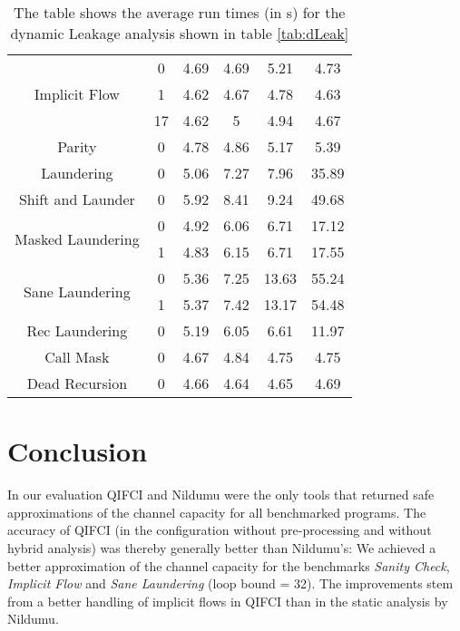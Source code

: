 \begin{table}[]
\begin{tabular}{cc|cc|cc}
\multirow{3}{*}{Implicit Flow}     & 0       & 4.69             & 4.69            & 5.21              & 4.73              \\
                                   & 1       & 4.62             & 4.67            & 4.78              & 4.63              \\
                                   & 17      & 4.62             & 5               & 4.94              & 4.67              \\\hline\hline
Parity                             & 0       & 4.78             & 4.86            & 5.17              & 5.39              \\\hline
Laundering                         & 0       & 5.06             & 7.27            & 7.96              & 35.89             \\\hline
Shift and Launder                  & 0       & 5.92             & 8.41            & 9.24              & 49.68             \\\hline
\multirow{2}{*}{Masked Laundering} & 0       & 4.92             & 6.06            & 6.71              & 17.12             \\
                                   & 1       & 4.83             & 6.15            & 6.71              & 17.55             \\\hline
\multirow{2}{*}{Sane Laundering}   & 0       & 5.36             & 7.25            & 13.63             & 55.24             \\
                                   & 1       & 5.37             & 7.42            & 13.17             & 54.48             \\\hline\hline
Rec Laundering                     & 0       & 5.19             & 6.05            & 6.61              & 11.97             \\\hline
Call Mask                          & 0       & 4.67             & 4.84            & 4.75              & 4.75              \\\hline
Dead Recursion                     & 0       & 4.66             & 4.64            & 4.65              & 4.69
\end{tabular}
\caption{The table shows the average run times (in s) for the dynamic Leakage analysis shown in table \ref{tab:dLeak}}\label{tab:dLeakTime}
\end{table}

\section{Conclusion}
In our evaluation QIFCI and Nildumu were the only tools that returned safe approximations of the channel capacity for all benchmarked programs.
The accuracy of QIFCI (in the configuration without pre-processing and without hybrid analysis) was thereby generally better than Nildumu's: We achieved a better approximation of the channel capacity for the benchmarks \emph{Sanity Check}, \emph{Implicit Flow} and \emph{Sane Laundering} (loop bound = 32). The improvements stem from a better handling of implicit flows in QIFCI than in the static analysis by Nildumu.